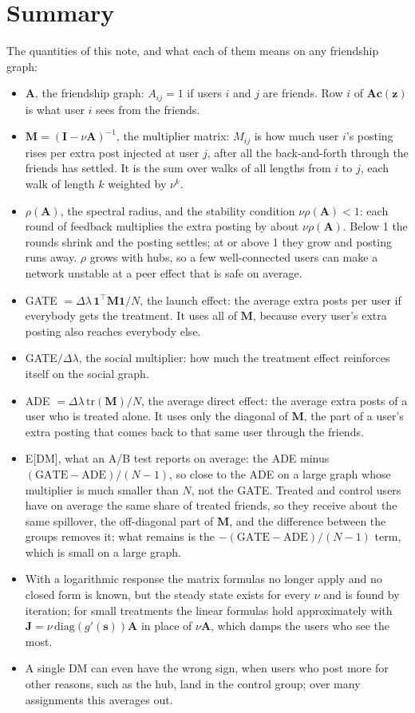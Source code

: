 \documentclass[11pt]{article}
\newcommand{\one}{\mathbf{1}}
\newcommand{\vc}{\boldsymbol{c}}
\newcommand{\vz}{\boldsymbol{z}}
\newcommand{\mA}{\mathbf{A}}
\newcommand{\mM}{\mathbf{M}}
\newcommand{\mI}{\mathbf{I}}
\begin{document}
\section{Summary}

The quantities of this note, and what each of them means on any friendship graph:

\begin{itemize}
\item $\mA$, the friendship graph: $A_{ij} = 1$ if users $i$ and $j$ are friends.  Row $i$ of $\mA\vc(\vz)$ is what user $i$ sees from the friends.
\item $\mM = (\mI - \nu\mA)^{-1}$, the multiplier matrix: $M_{ij}$ is how much user $i$'s posting rises per extra post injected at user $j$, after all the back-and-forth through the friends has settled.  It is the sum over walks of all lengths from $i$ to $j$, each walk of length $k$ weighted by $\nu^k$.
\item $\rho(\mA)$, the spectral radius, and the stability condition $\nu\rho(\mA) < 1$: each round of feedback multiplies the extra posting by about $\nu\rho(\mA)$.  Below 1 the rounds shrink and the posting settles; at or above 1 they grow and posting runs away.  $\rho$ grows with hubs, so a few well-connected users can make a network unstable at a peer effect that is safe on average.
\item GATE $= \Delta\lambda\,\one^\top\mM\one/N$, the launch effect: the average extra posts per user if everybody gets the treatment.  It uses all of $\mM$, because every user's extra posting also reaches everybody else.
\item GATE$/\Delta\lambda$, the social multiplier: how much the treatment effect reinforces itself on the social graph.
\item ADE $= \Delta\lambda\,\mathrm{tr}(\mM)/N$, the average direct effect: the average extra posts of a user who is treated alone.  It uses only the diagonal of $\mM$, the part of a user's extra posting that comes back to that same user through the friends.
\item E[DM], what an A/B test reports on average: the ADE minus $(\text{GATE} - \text{ADE})/(N-1)$, so close to the ADE on a large graph whose multiplier is much smaller than $N$, not the GATE.  Treated and control users have on average the same share of treated friends, so they receive about the same spillover, the off-diagonal part of $\mM$, and the difference between the groups removes it; what remains is the $-(\text{GATE} - \text{ADE})/(N-1)$ term, which is small on a large graph.
\item With a logarithmic response the matrix formulas no longer apply and no closed form is known, but the steady state exists for every $\nu$ and is found by iteration; for small treatments the linear formulas hold approximately with $\mathbf{J} = \nu\,\mathrm{diag}(g'(\boldsymbol{s}))\mA$ in place of $\nu\mA$, which damps the users who see the most.
\item A single DM can even have the wrong sign, when users who post more for other reasons, such as the hub, land in the control group; over many assignments this averages out.
\end{itemize}
\end{document}
